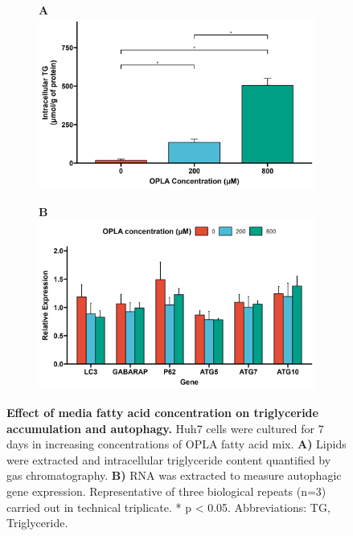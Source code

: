 \begin{figure}[h]
     \begin{subfigure}[b]{0.49\textwidth}
         \textbf{A}
         \centering
         \includegraphics[width=\textwidth]{figures/ch3-Model Development/LFHF TG.png}
     \end{subfigure}  
     \hfill
     \begin{subfigure}[b]{0.49\textwidth}
         \textbf{B}
         \centering
         \includegraphics[width=\textwidth]{figures/ch3-Model Development/LFHF ATG genes.png}
     \end{subfigure}
     \hfill
        \caption{\textbf{Effect of media fatty acid concentration on triglyceride accumulation and autophagy.} Huh7 cells were cultured for 7 days in increasing concentrations of OPLA fatty acid mix. \textbf{A)} Lipids were extracted and intracellular triglyceride content quantified by gas chromatography. \textbf{B)} RNA was extracted to measure autophagic gene expression. Representative of three biological repeats (n=3) carried out in technical triplicate. * p < 0.05. Abbreviations: TG, Triglyceride.}
        \label{fig:ch3-Model Development LFHF}
\end{figure}